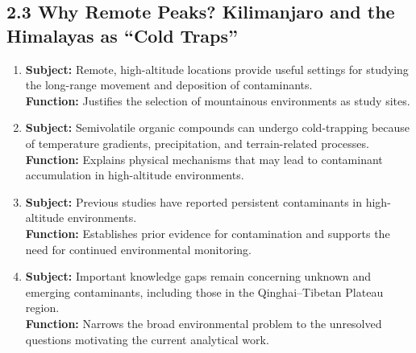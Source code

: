 \documentclass[11pt]{article}
\begin{document}
\begin{doublespace}
    \subsection{2.3 Why Remote Peaks? Kilimanjaro and the Himalayas as ``Cold Traps''}
        \begin{enumerate}[label=\textbf{Paragraph \arabic*:}, start=7, leftmargin=*]
            \item \textbf{Subject:} Remote, high-altitude locations provide useful settings for studying the long-range movement and deposition of contaminants.\\
            \textbf{Function:} Justifies the selection of mountainous environments as study sites.
            \item \textbf{Subject:} Semivolatile organic compounds can undergo cold-trapping because of temperature gradients, precipitation, and terrain-related processes.\\
            \textbf{Function:} Explains physical mechanisms that may lead to contaminant accumulation in high-altitude environments.
            \item \textbf{Subject:} Previous studies have reported persistent contaminants in high-altitude environments.\\
            \textbf{Function:} Establishes prior evidence for contamination and supports the need for continued environmental monitoring.
            \item \textbf{Subject:} Important knowledge gaps remain concerning unknown and emerging contaminants, including those in the Qinghai--Tibetan Plateau region.\\
            \textbf{Function:} Narrows the broad environmental problem to the unresolved questions motivating the current analytical work.
        \end{enumerate}


\end{doublespace}
\end{document}
